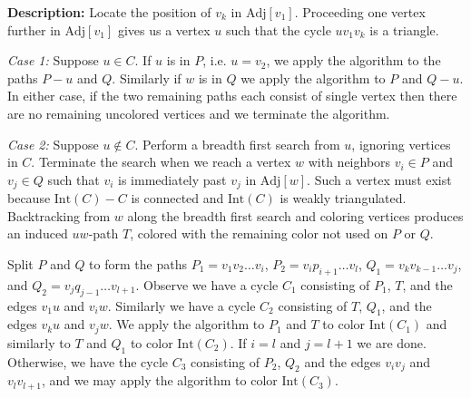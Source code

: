 \documentclass[letterpaper, 12pt]{article}
\theoremstyle{definition}
\theoremstyle{definition}
\theoremstyle{thm}
\theoremstyle{definition}
\begin{document}
\noindent\textbf{Description:} Locate the position of $v_k$ in
$\text{Adj}[v_1]$. Proceeding one vertex further in $\text{Adj}[v_1]$ gives us a
vertex $u$ such that the cycle $uv_1v_k$ is a triangle.

\textit{Case 1:} Suppose $u\in C$. If $u$ is in $P$, i.e. $u=v_2$, we apply the
algorithm to the paths $P-u$ and $Q$. Similarly if $w$ is in $Q$ we apply the
algorithm to $P$ and $Q-u$. In either case, if the two remaining paths each
consist of single vertex then there are no remaining uncolored vertices and we
terminate the algorithm.

\textit{Case 2:} Suppose $u\not\in C$. Perform a breadth first search from $u$,
ignoring vertices in $C$. Terminate the search when we reach a vertex
$w$ with neighbors $v_i\in P$ and $v_j \in Q$ such that $v_i$ is immediately
past $v_j$ in $\text{Adj}[w]$. Such a vertex must exist because
$\text{Int}(C)-C$ is connected and $\text{Int}(C)$ is weakly triangulated.
Backtracking from $w$ along the breadth first search and coloring vertices
produces an induced $uw$-path $T$, colored with the remaining color not used on
$P$ or $Q$.

Split $P$ and $Q$ to form the paths $P_1=v_1v_2\ldots v_i$, $P_2=v_ip_{i+1}\ldots v_l$,
$Q_1=v_kv_{k-1}\ldots v_j$, and $Q_2=v_jq_{j-1}\ldots v_{l+1}$. Observe we
have a cycle $C_1$ consisting of $P_1$, $T$, and the edges $v_1u$ and $v_iw$.
Similarly we have a cycle $C_2$ consisting of $T$, $Q_1$, and the edges $v_ku$
and $v_jw$. We apply the algorithm to $P_1$ and $T$ to color $\text{Int}(C_1)$
and similarly to $T$ and $Q_1$ to color $\text{Int}(C_2)$. If $i=l$ and
$j=l+1$ we are done. Otherwise, we have the cycle $C_3$ consisting of $P_2$,
$Q_2$ and the edges $v_iv_j$ and $v_lv_{l+1}$, and we may apply the algorithm to
color $\text{Int}(C_3)$.
\end{document}
